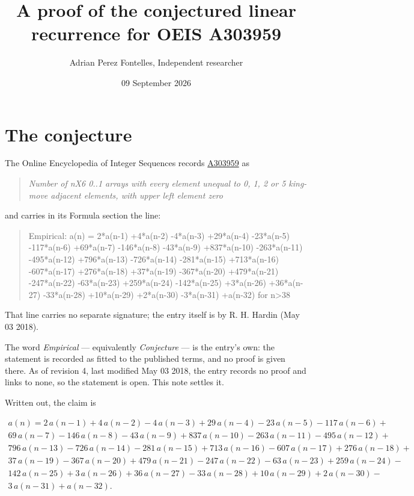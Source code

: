 \documentclass[11pt]{article}
\title{A proof of the conjectured linear recurrence for OEIS A303959}
\author{Adrian Perez Fontelles, Independent researcher}
\date{09 September 2026}
\theoremstyle{definition}
\begin{document}
\maketitle
\section{The conjecture}

The Online Encyclopedia of Integer Sequences records \href{https://oeis.org/A303959}{A303959} as

\begin{quote}\itshape Number of nX6 0..1 arrays with every element unequal to 0, 1, 2 or 5 king-move adjacent elements, with upper left element zero\end{quote}

and carries in its Formula section the line:

\begin{quote}\ttfamily Empirical: a(n) = 2*a(n-1) +4*a(n-2) -4*a(n-3) +29*a(n-4) -23*a(n-5) -117*a(n-6) +69*a(n-7) -146*a(n-8) -43*a(n-9) +837*a(n-10) -263*a(n-11) -495*a(n-12) +796*a(n-13) -726*a(n-14) -281*a(n-15) +713*a(n-16) -607*a(n-17) +276*a(n-18) +37*a(n-19) -367*a(n-20) +479*a(n-21) -247*a(n-22) -63*a(n-23) +259*a(n-24) -142*a(n-25) +3*a(n-26) +36*a(n-27) -33*a(n-28) +10*a(n-29) +2*a(n-30) -3*a(n-31) +a(n-32) for n>38\end{quote}

That line carries no separate signature; the entry itself is by R. H. Hardin (May 03 2018).

The word {\itshape Empirical} --- equivalently {\itshape Conjecture} --- is the entry's own: the statement is recorded as fitted to the published terms, and no proof is given there. As of revision 4, last modified May 03 2018, the entry records no proof and links to none, so the statement is open. This note settles it.

Written out, the claim is

\begin{multline*} a(n) = 2\,a(n-1) + 4\,a(n-2) - 4\,a(n-3) + 29\,a(n-4) - 23\,a(n-5) - 117\,a(n-6) + \\ 69\,a(n-7) - 146\,a(n-8) - 43\,a(n-9) + 837\,a(n-10) - 263\,a(n-11) - 495\,a(n-12) + \\ 796\,a(n-13) - 726\,a(n-14) - 281\,a(n-15) + 713\,a(n-16) - 607\,a(n-17) + 276\,a(n-18) + \\ 37\,a(n-19) - 367\,a(n-20) + 479\,a(n-21) - 247\,a(n-22) - 63\,a(n-23) + 259\,a(n-24) - \\ 142\,a(n-25) + 3\,a(n-26) + 36\,a(n-27) - 33\,a(n-28) + 10\,a(n-29) + 2\,a(n-30) - \\ 3\,a(n-31) + a(n-32). \end{multline*}
\end{document}

